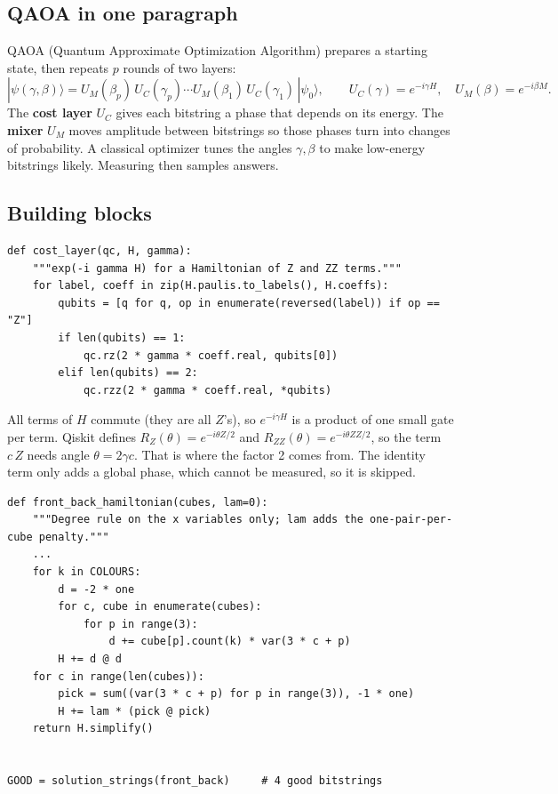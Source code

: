 \documentclass[11pt]{article}
\begin{document}
\subsection{QAOA in one paragraph}

QAOA (Quantum Approximate Optimization Algorithm) prepares a starting state,
then repeats $p$ rounds of two layers:
\[
|\psi(\gamma,\beta)\rangle
  = U_M(\beta_p)\,U_C(\gamma_p)\cdots U_M(\beta_1)\,U_C(\gamma_1)\,|\psi_0\rangle,
\qquad U_C(\gamma) = e^{-i\gamma H},\quad U_M(\beta) = e^{-i\beta M}.
\]
The \textbf{cost layer} $U_C$ gives each bitstring a phase that depends on its
energy. The \textbf{mixer} $U_M$ moves amplitude between bitstrings so those
phases turn into changes of probability. A classical optimizer tunes the angles
$\gamma, \beta$ to make low-energy bitstrings likely. Measuring then samples
answers.

\subsection{Building blocks}

\begin{lstlisting}
def cost_layer(qc, H, gamma):
    """exp(-i gamma H) for a Hamiltonian of Z and ZZ terms."""
    for label, coeff in zip(H.paulis.to_labels(), H.coeffs):
        qubits = [q for q, op in enumerate(reversed(label)) if op == "Z"]
        if len(qubits) == 1:
            qc.rz(2 * gamma * coeff.real, qubits[0])
        elif len(qubits) == 2:
            qc.rzz(2 * gamma * coeff.real, *qubits)
\end{lstlisting}

All terms of $H$ commute (they are all $Z$'s), so $e^{-i\gamma H}$ is a product
of one small gate per term. Qiskit defines
$R_Z(\theta) = e^{-i\theta Z/2}$ and $R_{ZZ}(\theta) = e^{-i\theta ZZ/2}$, so the
term $c\,Z$ needs angle $\theta = 2\gamma c$. That is where the factor 2 comes
from. The identity term only adds a global phase, which cannot be measured, so
it is skipped.

\begin{lstlisting}
def front_back_hamiltonian(cubes, lam=0):
    """Degree rule on the x variables only; lam adds the one-pair-per-cube penalty."""
    ...
    for k in COLOURS:
        d = -2 * one
        for c, cube in enumerate(cubes):
            for p in range(3):
                d += cube[p].count(k) * var(3 * c + p)
        H += d @ d
    for c in range(len(cubes)):
        pick = sum((var(3 * c + p) for p in range(3)), -1 * one)
        H += lam * (pick @ pick)
    return H.simplify()


GOOD = solution_strings(front_back)     # 4 good bitstrings
\end{lstlisting}
\end{document}

